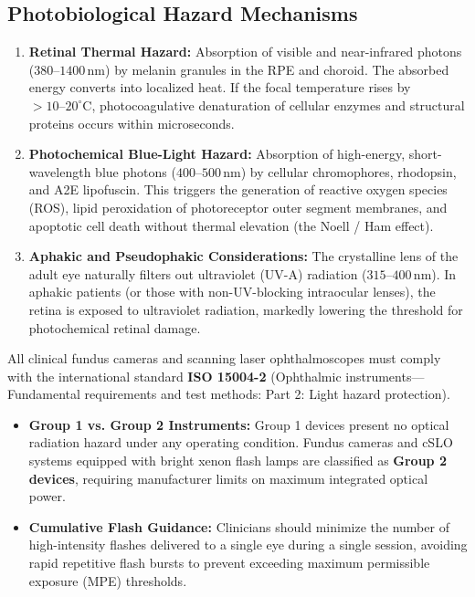 \documentclass[11pt,a4paper]{article}
\begin{document}
\subsection{Photobiological Hazard Mechanisms}

\begin{enumerate}[leftmargin=*]
    \item \textbf{Retinal Thermal Hazard:} Absorption of visible and near-infrared photons ($380\text{--}1400\,\text{nm}$) by melanin granules in the RPE and choroid. The absorbed energy converts into localized heat. If the focal temperature rises by $> 10\text{--}20^\circ\text{C}$, photocoagulative denaturation of cellular enzymes and structural proteins occurs within microseconds.
    \item \textbf{Photochemical Blue-Light Hazard:} Absorption of high-energy, short-wavelength blue photons ($400\text{--}500\,\text{nm}$) by cellular chromophores, rhodopsin, and A2E lipofuscin. This triggers the generation of reactive oxygen species (ROS), lipid peroxidation of photoreceptor outer segment membranes, and apoptotic cell death without thermal elevation (the Noell / Ham effect).
    \item \textbf{Aphakic and Pseudophakic Considerations:} The crystalline lens of the adult eye naturally filters out ultraviolet (UV-A) radiation ($315\text{--}400\,\text{nm}$). In aphakic patients (or those with non-UV-blocking intraocular lenses), the retina is exposed to ultraviolet radiation, markedly lowering the threshold for photochemical retinal damage.
\end{enumerate}

\begin{opticalsafety}
All clinical fundus cameras and scanning laser ophthalmoscopes must comply with the international standard \textbf{ISO 15004-2} (Ophthalmic instruments—Fundamental requirements and test methods: Part 2: Light hazard protection).
\begin{itemize}[leftmargin=*]
    \item \textbf{Group 1 vs. Group 2 Instruments:} Group 1 devices present no optical radiation hazard under any operating condition. Fundus cameras and cSLO systems equipped with bright xenon flash lamps are classified as \textbf{Group 2 devices}, requiring manufacturer limits on maximum integrated optical power.
    \item \textbf{Cumulative Flash Guidance:} Clinicians should minimize the number of high-intensity flashes delivered to a single eye during a single session, avoiding rapid repetitive flash bursts to prevent exceeding maximum permissible exposure (MPE) thresholds.
\end{itemize}
\end{opticalsafety}
\end{document}
